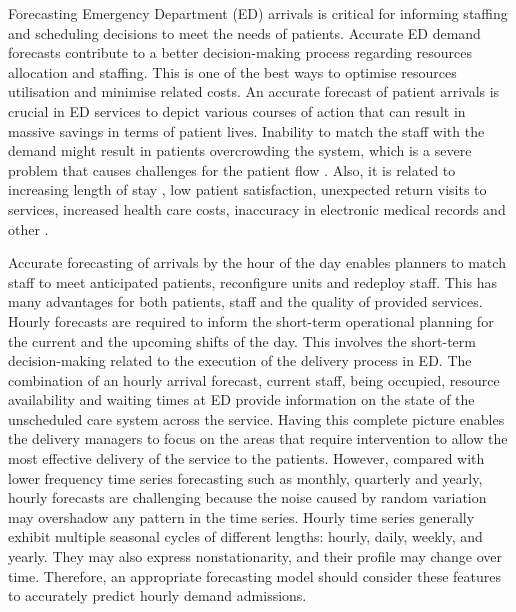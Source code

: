 \documentclass[]{elsarticle} %
\begin{document}
Forecasting Emergency Department (ED) arrivals is critical for informing
staffing and scheduling decisions to meet the needs of patients.
Accurate ED demand forecasts contribute to a better decision-making
process regarding resources allocation and staffing. This is one of the
best ways to optimise resources utilisation and minimise related costs.
An accurate forecast of patient arrivals is crucial in ED services to
depict various courses of action that can result in massive savings in
terms of patient lives. Inability to match the staff with the demand
might result in patients overcrowding the system, which is a severe
problem that causes challenges for the patient flow
\citep{derlet2002overcrowding}. Also, it is related to increasing length of
stay \citep{muhammet2015forecasting}, low patient satisfaction, unexpected
return visits to services, increased health care costs, inaccuracy in
electronic medical records and other \citep{ROSTAMITABAR20221197}.

Accurate forecasting of arrivals by the hour of the day enables planners
to match staff to meet anticipated patients, reconfigure units and
redeploy staff. This has many advantages for both patients, staff and
the quality of provided services. Hourly forecasts are required to
inform the short-term operational planning for the current and the
upcoming shifts of the day. This involves the short-term decision-making
related to the execution of the delivery process in ED. The combination
of an hourly arrival forecast, current staff, being occupied, resource
availability and waiting times at ED provide information on the state of
the unscheduled care system across the service. Having this complete
picture enables the delivery managers to focus on the areas that require
intervention to allow the most effective delivery of the service to the
patients. However, compared with lower frequency time series forecasting
such as monthly, quarterly and yearly, hourly forecasts are challenging
because the noise caused by random variation may overshadow any pattern
in the time series. Hourly time series generally exhibit multiple
seasonal cycles of different lengths: hourly, daily, weekly, and yearly.
They may also express nonstationarity, and their profile may change over
time. Therefore, an appropriate forecasting model should consider these
features to accurately predict hourly demand admissions.
\end{document}
